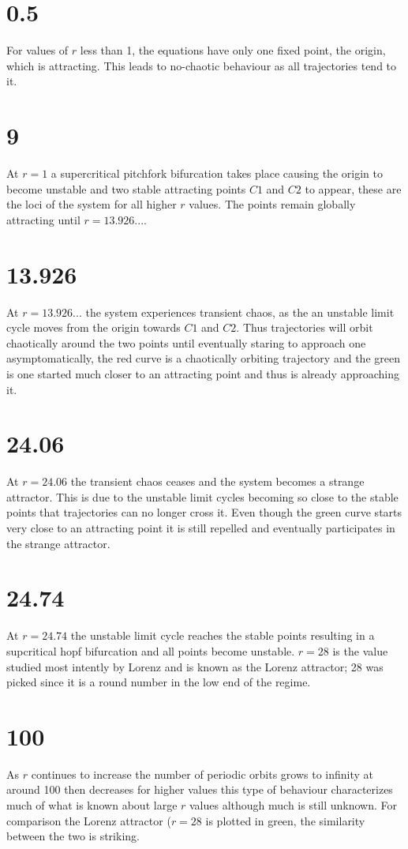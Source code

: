\documentclass[12pt]{article}
\begin{document}
\section{0.5}

For values of $r$ less than 1, the equations have only one fixed point, the origin, which is attracting. This leads to no-chaotic behaviour as all trajectories tend to it.

\section{9}

At $r = 1$ a supercritical pitchfork bifurcation takes place causing the origin to become unstable and two stable attracting points $C1$ and $C2$ to appear, these are the loci of the system for all higher $r$ values. The points remain globally attracting until $r = 13.926...$.

\section{13.926}
At $r=13.926...$ the system experiences transient chaos, as the an unstable limit cycle moves from the origin towards $C1$ and $C2$. Thus trajectories will orbit chaotically around the two points until eventually staring to approach one asymptomatically, the red curve is a chaotically orbiting trajectory and the green is one started much closer to an attracting point and thus is already approaching it.

\section{24.06}
At $r=24.06$ the transient chaos ceases and the system becomes a strange attractor. This is due to the unstable limit cycles becoming so close to the stable points that trajectories can no longer cross it. Even though the green curve starts very close to an attracting point it is still repelled and eventually participates in the strange attractor.

\section{24.74}
At $r=24.74$ the unstable limit cycle reaches the stable points resulting in a supcritical hopf bifurcation and all points become unstable. $r=28$ is the value studied most intently by Lorenz and is known as the Lorenz attractor; 28 was picked since it is a round number in the low end of the regime.

\section{100}
As $r$ continues to increase the number of periodic orbits grows to infinity at around 100 then decreases for higher values this type of behaviour characterizes much of what is known about large $r$ values although much is still unknown. For comparison the Lorenz attractor ($r=28$ is plotted in green, the similarity between the two is striking.
\end{document}

